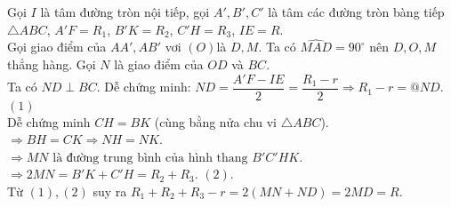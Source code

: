 \begin{bt}
{\begin{center}
		\end{center}
		Gọi $I$ là tâm đường tròn nội tiếp, gọi $A',B',C'$ là tâm các đường tròn bàng tiếp $\triangle ABC$, $A'F=R_1$, $B'K=R_2$, $C'H=R_3$, $IE=R$.\\
		Gọi giao điểm của $AA',AB'$ vơi $(O)$là $D,M$. Ta có $\widehat{MAD}=90^\circ$ nên $D,O,M$ thẳng hàng. Gọi $N$ là giao điểm của $OD$ và $BC$.\\
		Ta có $ND\perp BC$. Dễ chứng minh: $ ND=\dfrac{A'F-IE}{2}=\dfrac{R_1-r}{2} \Rightarrow R_1-r =@ND$. \hspace{\fill} $(1)$\\
		Dễ chứng minh $CH=BK$ (cùng bằng nửa chu vi $\triangle ABC$).\\
		$\Rightarrow BH=CK\Rightarrow NH=NK$.\\
		$\Rightarrow MN \text{ là đường trung bình của hình thang } B'C'HK$.\\
		$\Rightarrow 2MN = B'K+C'H=R_2+R_3$. \hspace{\fill} $(2)$.\\
		Từ $(1),(2)$ suy ra $R_1+R_2+R_3-r=2(MN+ND)=2MD=R$.        
		
	}
\end{bt}

